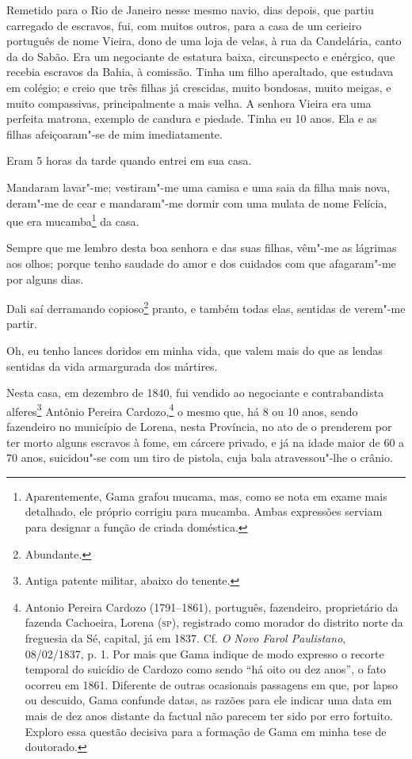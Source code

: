 Remetido para o Rio de Janeiro nesse mesmo navio, dias depois, que
partiu carregado de escravos, fui, com muitos outros, para a casa de um
cerieiro português de nome Vieira, dono de uma loja de velas, à rua da
Candelária, canto da do Sabão. Era um negociante de estatura baixa,
circunspecto e enérgico, que recebia escravos da Bahia, à comissão.
Tinha um filho aperaltado, que estudava em colégio; e creio que três
filhas já crescidas, muito bondosas, muito meigas, e muito compassivas,
principalmente a mais velha. A senhora Vieira era uma perfeita matrona,
exemplo de candura e piedade. Tinha eu 10 anos. Ela e as filhas
afeiçoaram"-se de mim imediatamente.

Eram 5 horas da tarde quando entrei em sua casa.

Mandaram lavar"-me; vestiram"-me uma camisa e uma saia da filha mais nova,
deram"-me de cear e mandaram"-me dormir com uma mulata de nome Felícia,
que era mucamba\footnote{Aparentemente, Gama grafou mucama, mas, como
  se nota em exame mais detalhado, ele próprio corrigiu para mucamba.
  Ambas expressões serviam para designar a função de criada doméstica.}
da casa.

Sempre que me lembro desta boa senhora e das suas filhas, vêm"-me as
lágrimas aos olhos; porque tenho saudade do amor e dos cuidados com que
afagaram"-me por alguns dias.

Dali saí derramando copioso\footnote{Abundante.} pranto, e também
todas elas, sentidas de verem"-me partir.

Oh, eu tenho lances doridos em minha vida, que valem mais do que as
lendas sentidas da vida armargurada dos mártires.

Nesta casa, em dezembro de 1840, fui vendido ao negociante e
contrabandista alferes\footnote{Antiga patente militar, abaixo do
  tenente.} Antônio Pereira Cardozo,\footnote{Antonio Pereira Cardozo
  (1791--1861), português, fazendeiro, proprietário da fazenda Cachoeira,
  Lorena (\textsc{sp}), registrado como morador do distrito norte da freguesia da
  Sé, capital, já em 1837. Cf. \emph{O Novo Farol Paulistano},
  08/02/1837, p. 1. Por mais que Gama indique de modo expresso o
  recorte temporal do suicídio de Cardozo como sendo ``há oito ou dez
  anos'', o fato ocorreu em 1861. Diferente de outras ocasionais
  passagens em que, por lapso ou descuido, Gama confunde datas, as razões
  para ele indicar uma data em mais de dez anos distante da factual não
  parecem ter sido por erro fortuito. Exploro essa questão decisiva para
  a formação de Gama em minha tese de doutorado.} o mesmo que, há 8 ou
10 anos, sendo fazendeiro no município de Lorena, nesta Província, no
ato de o prenderem por ter morto alguns escravos à fome, em cárcere
privado, e já na idade maior de 60 a 70 anos, suicidou"-se com um tiro de
pistola, cuja bala atravessou"-lhe o crânio.

